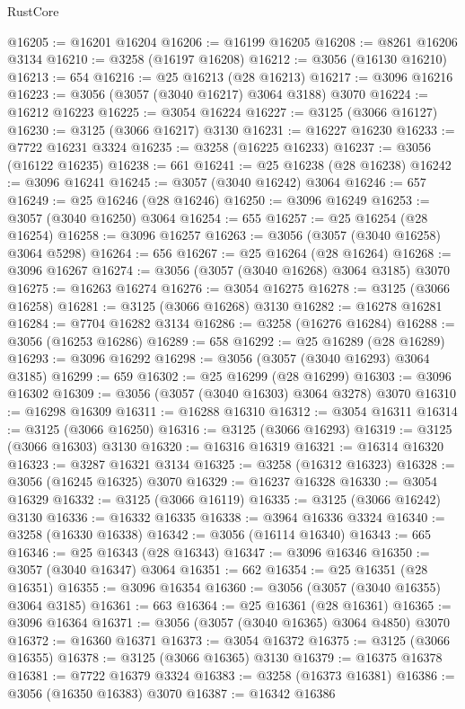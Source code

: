 \begin{lexlean}{RustCore}
\begin{coremodule}
@16205 := @16201 @16204
@16206 := @16199 @16205
@16208 := @8261 @16206 @3134
@16210 := @3258 (@16197 @16208)
@16212 := @3056 (@16130 @16210)
@16213 := 654
@16216 := @25 @16213 (@28 @16213)
@16217 := @3096 @16216
@16223 := @3056 (@3057 (@3040 @16217) @3064 @3188) @3070
@16224 := @16212 @16223
@16225 := @3054 @16224
@16227 := @3125 (@3066 @16127)
@16230 := @3125 (@3066 @16217) @3130
@16231 := @16227 @16230
@16233 := @7722 @16231 @3324
@16235 := @3258 (@16225 @16233)
@16237 := @3056 (@16122 @16235)
@16238 := 661
@16241 := @25 @16238 (@28 @16238)
@16242 := @3096 @16241
@16245 := @3057 (@3040 @16242) @3064
@16246 := 657
@16249 := @25 @16246 (@28 @16246)
@16250 := @3096 @16249
@16253 := @3057 (@3040 @16250) @3064
@16254 := 655
@16257 := @25 @16254 (@28 @16254)
@16258 := @3096 @16257
@16263 := @3056 (@3057 (@3040 @16258) @3064 @5298)
@16264 := 656
@16267 := @25 @16264 (@28 @16264)
@16268 := @3096 @16267
@16274 := @3056 (@3057 (@3040 @16268) @3064 @3185) @3070
@16275 := @16263 @16274
@16276 := @3054 @16275
@16278 := @3125 (@3066 @16258)
@16281 := @3125 (@3066 @16268) @3130
@16282 := @16278 @16281
@16284 := @7704 @16282 @3134
@16286 := @3258 (@16276 @16284)
@16288 := @3056 (@16253 @16286)
@16289 := 658
@16292 := @25 @16289 (@28 @16289)
@16293 := @3096 @16292
@16298 := @3056 (@3057 (@3040 @16293) @3064 @3185)
@16299 := 659
@16302 := @25 @16299 (@28 @16299)
@16303 := @3096 @16302
@16309 := @3056 (@3057 (@3040 @16303) @3064 @3278) @3070
@16310 := @16298 @16309
@16311 := @16288 @16310
@16312 := @3054 @16311
@16314 := @3125 (@3066 @16250)
@16316 := @3125 (@3066 @16293)
@16319 := @3125 (@3066 @16303) @3130
@16320 := @16316 @16319
@16321 := @16314 @16320
@16323 := @3287 @16321 @3134
@16325 := @3258 (@16312 @16323)
@16328 := @3056 (@16245 @16325) @3070
@16329 := @16237 @16328
@16330 := @3054 @16329
@16332 := @3125 (@3066 @16119)
@16335 := @3125 (@3066 @16242) @3130
@16336 := @16332 @16335
@16338 := @3964 @16336 @3324
@16340 := @3258 (@16330 @16338)
@16342 := @3056 (@16114 @16340)
@16343 := 665
@16346 := @25 @16343 (@28 @16343)
@16347 := @3096 @16346
@16350 := @3057 (@3040 @16347) @3064
@16351 := 662
@16354 := @25 @16351 (@28 @16351)
@16355 := @3096 @16354
@16360 := @3056 (@3057 (@3040 @16355) @3064 @3185)
@16361 := 663
@16364 := @25 @16361 (@28 @16361)
@16365 := @3096 @16364
@16371 := @3056 (@3057 (@3040 @16365) @3064 @4850) @3070
@16372 := @16360 @16371
@16373 := @3054 @16372
@16375 := @3125 (@3066 @16355)
@16378 := @3125 (@3066 @16365) @3130
@16379 := @16375 @16378
@16381 := @7722 @16379 @3324
@16383 := @3258 (@16373 @16381)
@16386 := @3056 (@16350 @16383) @3070
@16387 := @16342 @16386

\end{coremodule}
\end{lexlean}
